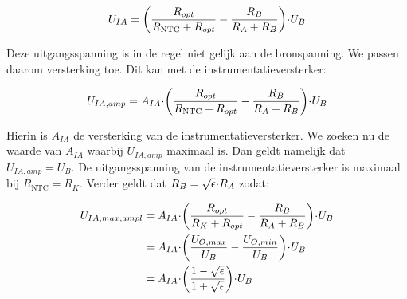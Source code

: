 \documentclass[12pt,a4paper,final,twoside,fleqn]{article}
\newcommand{\rntc}{R_\text{NTC}}
\newcommand{\ropt}{R_{opt}}
\let\oldcdot\cdot
\renewcommand{\cdot}{\kern-.10em\oldcdot\kern-.10em}
\begin{document}
\begin{equation}
U_{IA} = \left( \dfrac{\ropt}{\rntc+\ropt} - \dfrac{R_B}{R_A+R_B}\right)\cdot U_B 
\end{equation}

Deze uitgangsspanning is in de regel niet gelijk aan de bronspanning. We passen
daarom versterking toe. Dit kan met de instrumentatieversterker:

\begin{equation}
U_{IA,amp} =  A_{IA}\cdot\left( \dfrac{\ropt}{\rntc+\ropt} - \dfrac{R_B}{R_A+R_B}\right)\cdot U_B 
\end{equation}

Hierin is $A_{IA}$ de versterking van de instrumentatieversterker. We zoeken nu
de waarde van $A_{IA}$ waarbij $U_{IA,amp}$ maximaal is. Dan geldt namelijk dat
$U_{IA,amp}=U_B$.
De uitgangsspanning van de instrumentatieversterker is maximaal bij $\rntc = R_K$.
Verder geldt dat $R_B = \sqrt{\epsilon}\cdot R_A$
zodat:

\begin{equation}
\begin{split}
U_{IA,max,ampl} &= A_{IA}\cdot\left( \dfrac{\ropt}{R_K+\ropt} - \dfrac{R_B}{R_A+R_B}\right)\cdot U_B \\
&= A_{IA}\cdot\left(\dfrac{U_{O,max}}{U_B}-\dfrac{U_{O,min}}{U_B}\right)\cdot U_B \\
&= A_{IA}\cdot \left(\dfrac{1-\sqrt{\epsilon}}{1+\sqrt{\epsilon}}\right)\cdot U_B
\end{split}
\end{equation}


\end{document}

